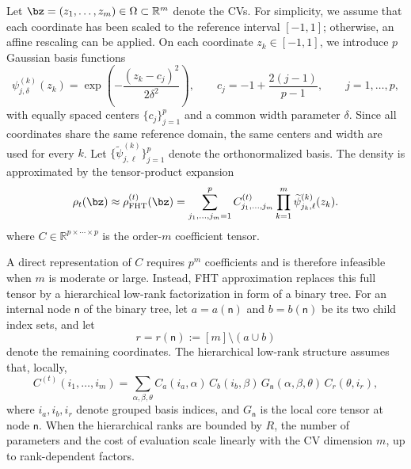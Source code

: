 \documentclass[a4paper,fleqn]{cas-sc}
\theoremstyle{definition}
\begin{document}
Let $\bz=(z_1,\dots,z_m)\in\Omega\subset\mathbb{R}^m$ denote the CVs. For simplicity, we assume that each coordinate has been scaled to the reference interval $[-1,1]$; otherwise, an affine rescaling can be applied. On each coordinate $z_k\in[-1,1]$, we introduce $p$ Gaussian basis functions
\begin{equation}
    \psi_{j,\delta}^{(k)}(z_k)
    = \exp\!\left(-\frac{(z_k-c_j)^2}{2\delta^2}\right),
    \qquad
    c_j=-1+\frac{2(j-1)}{p-1},
    \qquad
    j=1,\dots,p,
    \label{eq:gaussian_basis}
\end{equation}
with equally spaced centers $\{c_j\}_{j=1}^p$ and a common width parameter $\delta$. Since all coordinates share the same reference domain, the same centers and width are used for every $k$.
%
Let \(\{\widetilde\psi_{j,\ell}^{(k)}\}_{j=1}^p\) denote the orthonormalized basis. The density is approximated by the tensor-product expansion
\begin{equation}
\rho_t(\bz)
\approx
\rho_{\rm FHT}^{(t)}(\bz)
=
\sum_{j_1,\ldots,j_m=1}^p
C^{(t)}_{j_1,\ldots,j_m}
\prod_{k=1}^m
\widetilde\psi_{j_k,\ell}^{(k)}(z_k).
    \label{eq:tensor_expansion}
\end{equation}
where $C\in\mathbb{R}^{p\times\cdots\times p}$ is the order-$m$ coefficient tensor. 



A direct representation of $C$ requires $p^m$ coefficients and is therefore infeasible when $m$ is moderate or large.
%
Instead, FHT approximation replaces this full tensor by a hierarchical low-rank factorization in form of a binary tree. 
For an internal node \(\mathsf n\) of the binary tree, let \(a=a(\mathsf n)\) and \(b=b(\mathsf n)\) be its two child index sets, and let
\[
r=r(\mathsf n):=[m]\setminus(a\cup b)
\]
denote the remaining coordinates. 
The hierarchical low-rank structure assumes that, locally,
\begin{equation}
C^{(t)}(i_1,\ldots,i_m)
=
\sum_{\alpha,\beta,\theta}
C_a(i_a,\alpha)\,
C_b(i_b,\beta)\,
G_{\mathsf n}(\alpha,\beta,\theta)\,
C_r(\theta,i_r),
\label{eq:local_factorization}
\end{equation}
where \(i_a,i_b,i_r\) denote grouped basis indices, and \(G_{\mathsf n}\) is the local core tensor at node \(\mathsf n\). 
When the hierarchical ranks are bounded by \(R\), the number of parameters and the cost of evaluation scale linearly with the CV dimension \(m\), up to rank-dependent factors.
\end{document}
